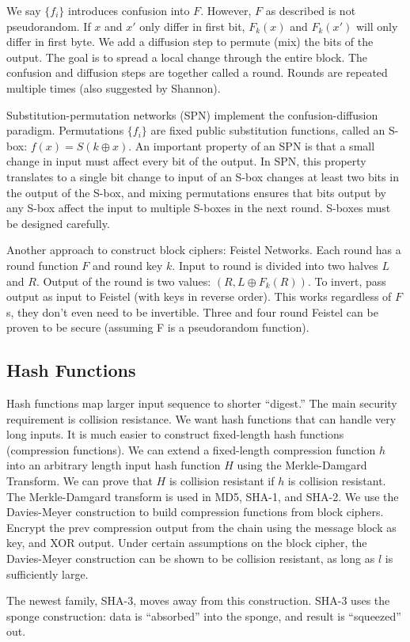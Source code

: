 We say $\{f_i\}$ introduces confusion into $F$.
However, $F$ as described is not pseudorandom. 
If $x$ and $x'$ only differ in first bit, $F_k(x)$ and 
$F_k(x')$ will only differ in first byte.
We add a diffusion step to permute (mix) 
the bits of the output.
The goal is to spread a local change through the entire block.
The confusion and diffusion steps are together called a round.
Rounds are repeated multiple times (also suggested by Shannon).

Substitution-permutation networks (SPN) implement the confusion-diffusion
paradigm.
Permutations $\{f_i\}$ are fixed public substitution 
functions, called an S-box: $f(x) = S(k\oplus x)$.
An important property of an SPN is that a small change in input must affect
every bit of the output.
In SPN, this property translates to a single bit change 
to input of an S-box changes at least two bits in the 
output of the S-box, and mixing permutations ensures 
that bits output by any S-box affect the input to
multiple S-boxes in the next round. 
S-boxes must be designed carefully.

Another approach to construct block ciphers: Feistel Networks.
Each round has a round function $F$ and round key $k$.
Input to round is divided into two halves $L$ and $R$.
Output of the round is two values: $(R, L \oplus F_k(R))$.
To invert, pass output as input to Feistel (with
keys in reverse order).
This works regardless of $F$s, they don't even need
to be invertible.
Three and four round Feistel can be proven to be secure (assuming F is a
pseudorandom function).

\subsection{Hash Functions}

Hash functions map larger input sequence to shorter “digest.”
The main security requirement is collision resistance. 
We want hash functions that can handle very long inputs.
It is much easier to construct fixed-length hash functions (compression functions).
We can extend a fixed-length compression function $h$ into an arbitrary length
input hash function $H$
using the Merkle-Damgard Transform.
We can prove that $H$ is collision resistant if $h$ is collision resistant.
The Merkle-Damgard transform is used in MD5, SHA-1, and SHA-2.
We use the Davies-Meyer construction to build compression functions from block 
ciphers.
Encrypt the prev compression output from the chain using the message block as
key, and XOR output.
Under certain assumptions on the block cipher, the Davies-Meyer construction
can be shown to be collision resistant, as long as $l$ is sufficiently large.

The newest family, SHA-3, moves away from this construction.
SHA-3 uses the sponge construction: data is “absorbed” into the sponge, and
result is “squeezed” out.